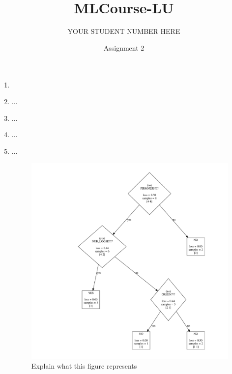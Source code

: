 \documentclass{article}
\title{MLCourse-LU}
\author{YOUR STUDENT NUMBER HERE}
\date{Assignment 2}
\begin{document}
\maketitle



\begin{enumerate}
    \item %
    
    \item ...%
    

    \item ... %
    
    \item ... %
    
    \item ... %
    
    
    \begin{figure}[H]
        \centering
        \includegraphics[width=\linewidth]{avocado.pdf}
        \caption{Explain what this figure represents}
        \label{fig:bad tree}
    \end{figure}



\end{enumerate}
\end{document}
